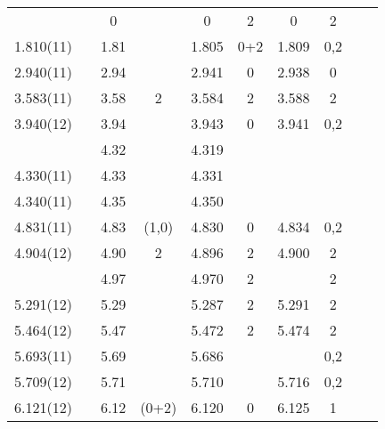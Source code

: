 \begin{landscape}
\begin{center}
\begin{longtable}{cc cc cc cc cc}
\endlastfoot


                &              & 0        &         & 0          &     2          & 0     & 2        &          &      \\
1.810(11)       &              & 1.81     &         & 1.805      &   0+2          & 1.809 & 0,2      &          &      \\
2.940(11)       &              & 2.94     &         & 2.941      &   0            & 2.938 & 0        &          &      \\
3.583(11)       &              & 3.58     & 2       & 3.584      &   2            & 3.588 & 2        &          &      \\
3.940(12)       &              & 3.94     &         & 3.943      &   0            & 3.941 & 0,2      &          &      \\
                &              & 4.32     &         & 4.319      &                &       &          &          &      \\
4.330(11)       &              & 4.33     &         & 4.331      &                &       &          &          &      \\
4.340(11)       &              & 4.35     &         & 4.350      &                &       &          &          &      \\
4.831(11)       &              & 4.83     & (1,0)   & 4.830      &   0            & 4.834 & 0,2      &          &      \\
4.904(12)       &              & 4.90     & 2       & 4.896      &   2            & 4.900 & 2        &          &      \\
                &              & 4.97     &         & 4.970      &   2            &       & 2        &          &      \\
5.291(12)       &              & 5.29     &         & 5.287      &   2            & 5.291 & 2        &          &      \\
5.464(12)       &              & 5.47     &         & 5.472      &   2            & 5.474 & 2        &          &      \\
5.693(11)       &              & 5.69     &         & 5.686      &                &       & 0,2      &          &      \\
5.709(12)       &              & 5.71     &         & 5.710      &                & 5.716 & 0,2      &          &      \\
6.121(12)       &              & 6.12     & (0+2)   & 6.120      &  0             & 6.125 & 1        &          &      \\

\end{longtable}
\end{center}
\end{landscape}
